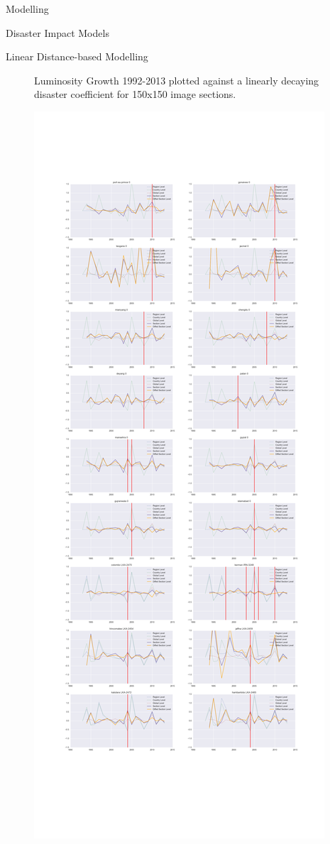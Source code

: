 \documentclass[12pt,fleqn,leqno,letterpaper]{article}
\begin{document}
\begin{section}{Modelling}
\begin{subsection}{Disaster Impact Models}
\begin{subsubsection}{Linear Distance-based Modelling}
\begin{figure}
        \caption{Luminosity Growth 1992-2013 plotted against a linearly decaying disaster coefficient for 150x150 image sections.}
      \end{figure}
    \end{subsubsection}
    \begin{figure}[t!]
      \centering
      \includegraphics[width=1\linewidth]{pca_balancer_diffs}\label{fig:weighted_balanced_luminosity_sum_series} %

\end{figure}
\end{subsection}
\end{section}
\end{document}
